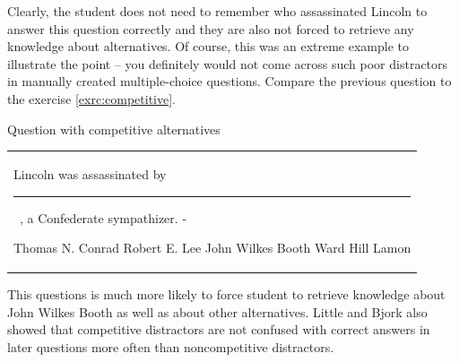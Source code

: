 \documentclass[12pt, twoside]{fithesis2}
\renewcommand{\_}{\leavevmode \kern0.07em\vbox{\hrule width0.4em}}
\newcounter{choice}
\renewcommand\thechoice{\Alph{choice}}
\newcommand\choicelabel{\thechoice.}
\newenvironment{choices}%
  {\vspace{0.8em}\list{\choicelabel}%
     {\usecounter{choice}\def\makelabel##1{\hss\llap{##1}}%
       \settowidth{\leftmargin}{W.\hskip\labelsep\hskip 0.01em}%
       \def\choice{%
         \item
       } %
       \labelwidth\leftmargin\advance\labelwidth-\labelsep
       \topsep=0pt
       \partopsep=0pt
     }%
  }%
  {\vspace{-0.7em}\endlist}
\newenvironment{question}
{
  \begin{center}
  \vspace{-0.5em}
  \begin{tabular}{p{0.9\textwidth}}
}
{
  \\
  \end{tabular}
  \vspace{-1em}
  \end{center}
}
\newcommand{\sentenceGap}{\rule{1.5cm}{0.4pt}~}
\begin{document}
\noindent
Clearly, the student does not need to remember who assassinated Lincoln to answer this question correctly and they are also not forced to retrieve any knowledge about alternatives.
Of course, this was an extreme example to illustrate the point -- you definitely would not come across such poor distractors in manually created multiple-choice questions.
Compare the previous question to the exercise \ref{exrc:competitive}.
\begin{exercise}
\caption{Question with competitive alternatives}\label{exrc:competitive}
  \begin{question}
  Lincoln was assassinated by \sentenceGap , a Confederate sympathizer.
  \begin{choices}
    \choice Thomas N. Conrad
    \choice Robert E. Lee
    \choice John Wilkes Booth
    \choice Ward Hill Lamon
  \end{choices}
  \end{question}
\end{exercise}

\noindent
This questions is much more likely to force student to retrieve knowledge about John Wilkes Booth as well as about other alternatives.
Little and Bjork also showed that competitive distractors are not confused with correct answers in later questions more often than noncompetitive distractors.
\end{document}
